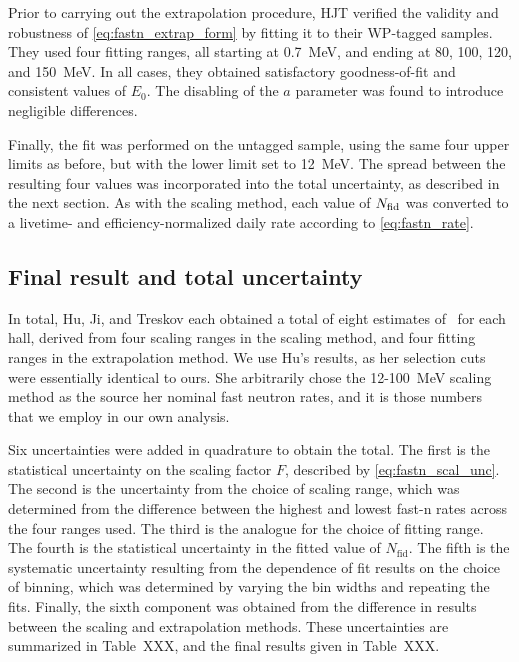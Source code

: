 \documentclass[../thesis.tex]{subfiles}
\begin{document}
Prior to carrying out the extrapolation procedure, HJT verified the validity and
robustness of \eqref{eq:fastn_extrap_form} by fitting it to their WP-tagged
samples. They used four fitting ranges, all starting at 0.7~MeV, and ending at
80, 100, 120, and 150~MeV. In all cases, they obtained satisfactory
goodness-of-fit and consistent values of $E_0$. The disabling of the $a$
parameter was found to introduce negligible differences.

Finally, the fit was performed on the untagged sample, using the same four upper
limits as before, but with the lower limit set to 12~MeV. The spread between the
resulting four values was incorporated into the total uncertainty, as described
in the next section. As with the scaling method, each value of $N_\mathrm{fid}$ was
converted to a livetime- and efficiency-normalized daily rate according to
\eqref{eq:fastn_rate}.

\subsection{Final result and total uncertainty}
\label{sec:fastn_comb}

In total, Hu, Ji, and Treskov each obtained a total of eight estimates of \rfn\
for each hall, derived from four scaling ranges in the scaling method, and four
fitting ranges in the extrapolation method. We use Hu's results, as her
selection cuts were essentially identical to ours. She arbitrarily chose the
12-100~MeV scaling method as the source her nominal fast neutron rates, and it
is those numbers that we employ in our own analysis.

Six uncertainties were added in quadrature to obtain the total. The first is the
statistical uncertainty on the scaling factor $F$, described by
\eqref{eq:fastn_scal_unc}. The second is the uncertainty from the choice of
scaling range, which was determined from the difference between the highest and
lowest fast-n rates across the four ranges used. The third is the analogue for
the choice of fitting range. The fourth is the statistical uncertainty in the
fitted value of $N_\mathrm{fid}$. The fifth is the systematic uncertainty
resulting from the dependence of fit results on the choice of binning, which was
determined by varying the bin widths and repeating the fits. Finally, the sixth
component was obtained from the difference in results between the scaling and
extrapolation methods. These uncertainties are summarized in Table~XXX, and the
final results given in Table~XXX.
\end{document}
